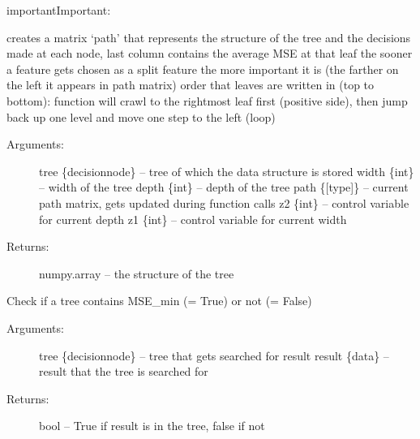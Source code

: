 \documentclass[letterpaper,10pt,english]{sphinxmanual}
\begin{document}
\begin{sphinxadmonition}{important}{Important:}
\begin{fulllineitems}
creates a matrix `path' that represents the structure of the tree and the decisions made at each node, last column contains the average MSE at that leaf
the sooner a feature gets chosen as a split feature the more important it is (the farther on the left it appears in path matrix)
order that leaves are written in (top to bottom): function will crawl to the rightmost leaf first (positive side), then jump back up one level and move one step to the left (loop)
\begin{description}
\item[{Arguments:}] \leavevmode
tree \{decisionnode\} -- tree of which the data structure is stored
width \{int\} -- width of the tree
depth \{int\} -- depth of the tree
path \{{[}type{]}\} -- current path matrix, gets updated during function calls
z2 \{int\} -- control variable for current depth
z1 \{int\} -- control variable for current width

\item[{Returns:}] \leavevmode
numpy.array -- the structure of the tree

\end{description}

\end{fulllineitems}

\label{\detokenize{DT:checkpath}}

\begin{fulllineitems}
\label{\detokenize{DT:ForestFire.Main.check_path}}
Check if a tree contains MSE\_min (= True) or not (= False)
\begin{description}
\item[{Arguments:}] \leavevmode
tree \{decisionnode\} -- tree that gets searched for result
result \{data\} -- result that the tree is searched for

\item[{Returns:}] \leavevmode
bool -- True if result is in the tree, false if not

\end{description}

\end{fulllineitems}

\label{\detokenize{DT:blank}}\end{sphinxadmonition}
\begin{figure}[htbp]
\centering

\noindent{}
\label{\detokenize{DT:blank}}\end{figure}
\end{document}
